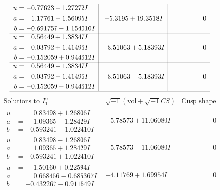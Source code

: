 \documentclass[1p]{elsarticle_modified}
\theoremstyle{definition}
\newcommand{\I}{\sqrt{-1}}
\begin{document}
$$\begin{array}{c|c|c}
\begin{aligned}
u &= -0.77623 - 1.27272 I \\
a &= \phantom{-}1.17761 - 1.56095 I \\
b &= -0.691757 - 1.154010 I\end{aligned}
 & -5.3195 + 19.3518 I & \phantom{-0.000000 } 0 \\ \hline\begin{aligned}
u &= \phantom{-}0.56449 + 1.38347 I \\
a &= \phantom{-}0.03792 + 1.41496 I \\
b &= -0.152059 + 0.944612 I\end{aligned}
 & -8.51063 + 5.18393 I & \phantom{-0.000000 } 0 \\ \hline\begin{aligned}
u &= \phantom{-}0.56449 - 1.38347 I \\
a &= \phantom{-}0.03792 - 1.41496 I \\
b &= -0.152059 - 0.944612 I\end{aligned}
 & -8.51063 - 5.18393 I & \phantom{-0.000000 } 0\\
 \hline 
 \end{array}$$\newpage$$\begin{array}{c|c|c}  
\text{Solutions to }I^u_{1}& \I (\text{vol} + \sqrt{-1}CS) & \text{Cusp shape}\\
 \hline 
\begin{aligned}
u &= \phantom{-}0.83498 + 1.26806 I \\
a &= \phantom{-}1.09365 - 1.28429 I \\
b &= -0.593241 - 1.022410 I\end{aligned}
 & -5.78573 + 11.06080 I & \phantom{-0.000000 } 0 \\ \hline\begin{aligned}
u &= \phantom{-}0.83498 - 1.26806 I \\
a &= \phantom{-}1.09365 + 1.28429 I \\
b &= -0.593241 + 1.022410 I\end{aligned}
 & -5.78573 - 11.06080 I & \phantom{-0.000000 } 0 \\ \hline\begin{aligned}
u &= \phantom{-}1.50160 + 0.22594 I \\
a &= \phantom{-}0.668456 - 0.685367 I \\
b &= -0.432267 - 0.911549 I\end{aligned}
 & -4.11769 + 1.69954 I & \phantom{-0.000000 } 0 \\ \hline\begin{aligned}

\end{aligned}
\end{array}$$
\end{document}
